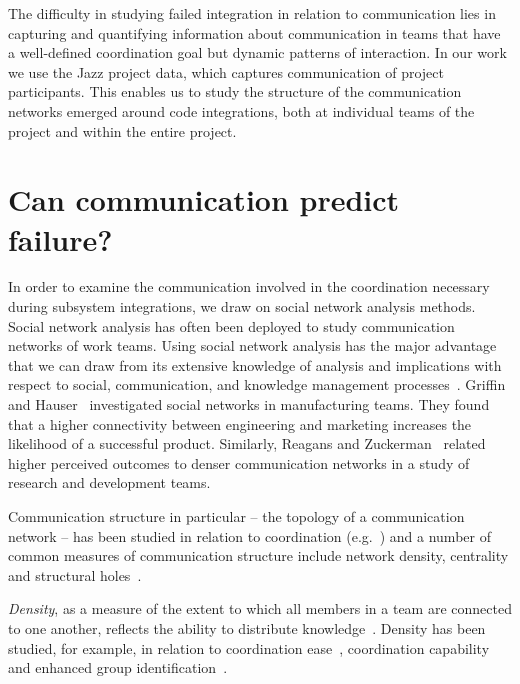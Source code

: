 The difficulty in studying failed integration in relation to communication lies
in capturing and quantifying information about communication in teams that have a
well-defined coordination goal but dynamic patterns of interaction. In our work
we use the Jazz project data, which captures communication of project
participants. This enables us to study the structure of the communication
networks emerged around code integrations, both at individual teams of the
project and within the entire project.



\section{Can communication predict failure?}
\label{sec:ResearchQuestions}
In order to examine the communication involved in the coordination necessary
during subsystem integrations, we draw on social network analysis methods. Social
network analysis has often been deployed to study communication networks of work
teams. Using social network analysis has the major advantage that we can draw
from its extensive knowledge of analysis and implications with respect to social,
communication, and knowledge management
processes~\cite{Burt:1995vo,Freeman:1979rl}. Griffin and
Hauser~\cite{Griffin:1992ms} investigated social networks in manufacturing teams.
They found that a higher connectivity between engineering and marketing increases
the likelihood of a successful product. Similarly, Reagans and
Zuckerman~\cite{RayReagans:2001os} related higher perceived outcomes to denser
communication networks in a study of research and development teams.

Communication structure in particular -- the topology of a communication network
-- has been studied in relation to coordination
(e.g.~\cite{hossain:cscw:2006,hinds:cscw:2006}) and a number of common measures of
communication structure include network density, centrality and structural
holes~\cite{Wasserman:1994sq,Freeman:1979rl}.


\emph{Density}, as a measure of the extent to which all members in a team are
connected to one another, reflects the ability to distribute
knowledge~\cite{Rulke:2000ys}. Density has been studied, for example, in relation
to coordination ease~\cite{hinds:cscw:2006}, coordination
capability~\cite{hossain:cscw:2006} and enhanced group
identification~\cite{RayReagans:2001os}.


